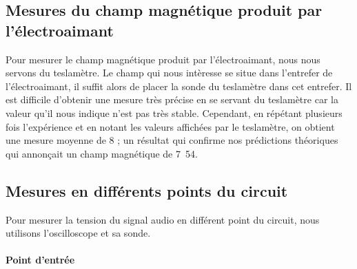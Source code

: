 \subsection{Mesures du champ magnétique produit par l'électroaimant}
Pour mesurer le champ magnétique produit par l'électroaimant, nous nous servons du teslamètre.
Le champ qui nous intèresse se situe dans l'entrefer de l'électroaimant, il suffit alors de placer
la sonde du teslamètre dans cet entrefer. Il est difficile d'obtenir une mesure très précise en se
servant du teslamètre car la valeur qu'il nous indique n'est pas très stable. Cependant, en répétant
plusieurs fois l'expérience et en notant les valeurs affichées par le teslamètre, on obtient une mesure
moyenne de \unit{8}{\centi\tesla} ; un résultat qui confirme nos prédictions théoriques
qui annonçait un champ magnétique de \unit{7.54}{\centi\tesla}.

\subsection{Mesures en différents points du circuit}
Pour mesurer la tension du signal audio en différent point du circuit, nous utilisons l'oscilloscope
et sa sonde.

\paragraph{Point d'entrée}

\paragraph{}


